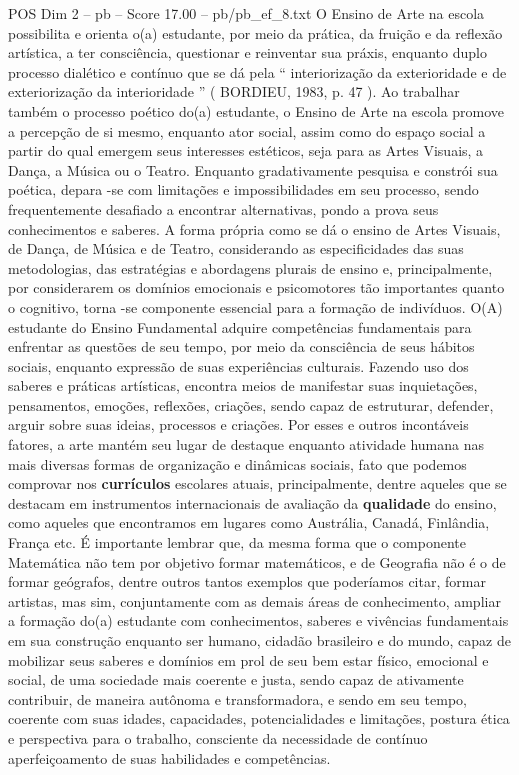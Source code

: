 \begin{textsample}{POS Dim 2 – pb – Score 17.00 – pb/pb\_ef\_8.txt}
O Ensino de Arte na escola possibilita e orienta o(a) estudante, por meio da prática, da fruição e da reflexão artística, a ter consciência, questionar e reinventar sua práxis, enquanto duplo processo dialético e contínuo que se dá pela “ interiorização da exterioridade e de exteriorização da interioridade ” ( BORDIEU, 1983, p. 47 ).
Ao trabalhar também o processo poético do(a) estudante, o Ensino de Arte na escola promove a percepção de si mesmo, enquanto ator social, assim como do espaço social a partir do qual emergem seus interesses estéticos, seja para as Artes Visuais, a Dança, a Música ou o Teatro.
Enquanto gradativamente pesquisa e constrói sua poética, depara -se com limitações e impossibilidades em seu processo, sendo frequentemente desafiado a encontrar alternativas, pondo a prova seus conhecimentos e saberes.
A forma própria como se dá o ensino de Artes Visuais, de Dança, de Música e de Teatro, considerando as especificidades das suas metodologias, das estratégias e abordagens plurais de ensino e, principalmente, por considerarem os domínios emocionais e psicomotores tão importantes quanto o cognitivo, torna -se componente essencial para a formação de indivíduos.
O(A) estudante do Ensino Fundamental adquire competências fundamentais para enfrentar as questões de seu tempo, por meio da consciência de seus hábitos sociais, enquanto expressão de suas experiências culturais.
Fazendo uso dos saberes e práticas artísticas, encontra meios de manifestar suas inquietações, pensamentos, emoções, reflexões, criações, sendo capaz de estruturar, defender, arguir sobre suas ideias, processos e criações.
Por esses e outros incontáveis fatores, a arte mantém seu lugar de destaque enquanto atividade humana nas mais diversas formas de organização e dinâmicas sociais, fato que podemos comprovar nos \textbf{currículos} escolares atuais, principalmente, dentre aqueles que se destacam em instrumentos internacionais de avaliação da \textbf{qualidade} do ensino, como aqueles que encontramos em lugares como Austrália, Canadá, Finlândia, França etc.
É importante lembrar que, da mesma forma que o componente Matemática não tem por objetivo formar matemáticos, e de Geografia não é o de formar geógrafos, dentre outros tantos exemplos que poderíamos citar, formar artistas, mas sim, conjuntamente com as demais áreas de conhecimento, ampliar a formação do(a) estudante com conhecimentos, saberes e vivências fundamentais em sua construção enquanto ser humano, cidadão brasileiro e do mundo, capaz de mobilizar seus saberes e domínios em prol de seu bem estar físico, emocional e social, de uma sociedade mais coerente e justa, sendo capaz de ativamente contribuir, de maneira autônoma e transformadora, e sendo em seu tempo, coerente com suas idades, capacidades, potencialidades e limitações, postura ética e perspectiva para o trabalho, consciente da necessidade de contínuo aperfeiçoamento de suas habilidades e competências.

\end{textsample}

